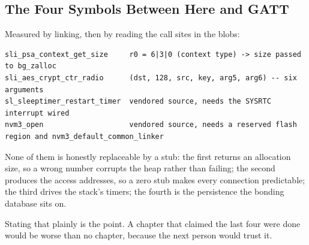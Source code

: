 \subsection{The Four Symbols Between Here and GATT}

Measured by linking, then by reading the call sites in the blobs:

\begin{verbatim}
sli_psa_context_get_size     r0 = 6|3|0 (context type) -> size passed to bg_zalloc
sli_aes_crypt_ctr_radio      (dst, 128, src, key, arg5, arg6) -- six arguments
sl_sleeptimer_restart_timer  vendored source, needs the SYSRTC interrupt wired
nvm3_open                    vendored source, needs a reserved flash region and nvm3_default_common_linker
\end{verbatim}

None of them is honestly replaceable by a stub: the first returns an allocation size, so a wrong number
corrupts the heap rather than failing; the second produces the access addresses, so a zero stub makes
every connection predictable; the third drives the stack's timers; the fourth is the persistence the
bonding database sits on.

Stating that plainly is the point. A chapter that claimed the last four were done would be worse than
no chapter, because the next person would trust it.
